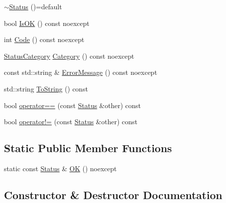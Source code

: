 \begin{DoxyCompactItemize}
\mbox{\hyperlink{classonnxruntime_1_1common_1_1Status_adb22aef9f5c8fb1ce653e6b73e10c4a3}{$\sim$\+Status}} ()=default
\item 
bool \mbox{\hyperlink{classonnxruntime_1_1common_1_1Status_a33571ea319ac8fa8360c4da5bfa4ac29}{Is\+OK}} () const noexcept
\item 
int \mbox{\hyperlink{classonnxruntime_1_1common_1_1Status_aafbde9279ae3e29b86434df2149763fc}{Code}} () const noexcept
\item 
\mbox{\hyperlink{namespaceonnxruntime_1_1common_afab40a94a5b6b651a1c24921d4e5c4d5}{Status\+Category}} \mbox{\hyperlink{classonnxruntime_1_1common_1_1Status_a10ca39b7d5e923520d120e03f66883e0}{Category}} () const noexcept
\item 
const std\+::string \& \mbox{\hyperlink{classonnxruntime_1_1common_1_1Status_a3d81c961641be49f8496aa2d67876443}{Error\+Message}} () const noexcept
\item 
std\+::string \mbox{\hyperlink{classonnxruntime_1_1common_1_1Status_a30deaaae9d10c455b820c1ad990363d8}{To\+String}} () const
\item 
bool \mbox{\hyperlink{classonnxruntime_1_1common_1_1Status_a9807e59de6004cdb14f604c8dff972b6}{operator==}} (const \mbox{\hyperlink{classonnxruntime_1_1common_1_1Status}{Status}} \&other) const
\item 
bool \mbox{\hyperlink{classonnxruntime_1_1common_1_1Status_ab56ff2107a2a584e96c4ca789c6091fb}{operator!=}} (const \mbox{\hyperlink{classonnxruntime_1_1common_1_1Status}{Status}} \&other) const
\end{DoxyCompactItemize}
\subsection*{Static Public Member Functions}
\begin{DoxyCompactItemize}
\item 
static const \mbox{\hyperlink{classonnxruntime_1_1common_1_1Status}{Status}} \& \mbox{\hyperlink{classonnxruntime_1_1common_1_1Status_aa38cc1876df38fa258f7ce916cc8cdb7}{OK}} () noexcept
\end{DoxyCompactItemize}


\subsection{Constructor \& Destructor Documentation}
\mbox{\label{classonnxruntime_1_1common_1_1Status_aecf53098eda21808805fadf3b799aeac}} 
